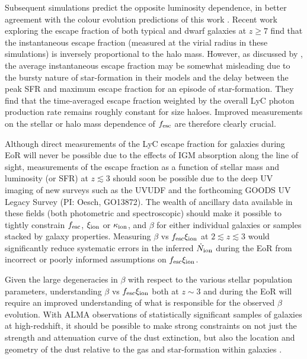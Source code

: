 Subsequent simulations predict the opposite luminosity dependence, in better agreement with the colour evolution predictions of this work \citep{Razoumov:2010bh,Yajima:2010fb}. Recent work exploring the escape fraction of both typical \citep{Kimm:2014gv} and dwarf \citep{Wise:2014kt} galaxies at $z\geq7$ find that the instantaneous escape fraction (measured at the virial radius in these simulations) is inversely proportional to the halo mass. However, as discussed by \citet{Kimm:2014gv}, the average instantaneous escape fraction may be somewhat misleading due to the bursty nature of star-formation in their models and the delay between the peak SFR and maximum escape fraction for an episode of star-formation. They find that the time-averaged escape fraction weighted by the overall LyC photon production rate remains roughly constant for size haloes. Improved measurements on the stellar or halo mass dependence of $f_{\rm{esc}}$ are therefore clearly crucial.

Although direct measurements of the LyC escape fraction for galaxies during EoR will never be possible due to the effects of IGM absorption along the line of sight, measurements of the escape fraction as a function of stellar mass and luminosity (or SFR) at $z \lesssim 3$ should soon be possible due to the deep UV imaging of new surveys such as the UVUDF \citep{Teplitz:2013jg} and the forthcoming GOODS UV Legacy Survey (PI: Oesch, GO13872). The wealth of ancillary data available in these fields (both photometric and spectroscopic) should make it possible to tightly constrain $f_{\rm{esc}}$, $\xi_{\rm{ion}}$ or $\kappa_{\rm{ion}}$, and $\beta$ for either individual galaxies or samples stacked by galaxy properties. Measuring $\beta$ vs $f_{\rm{esc}}\xi_{\rm{ion}}$ at $2 \lesssim z \lesssim 3$ would significantly reduce systematic errors in the inferred $\dot{N}_{\rm{ion}}$ during the EoR from incorrect or poorly informed assumptions on $f_{\rm{esc}}\xi_{\rm{ion}}$.

Given the large degeneracies in $\beta$ with respect to the various stellar population parameters, understanding  $\beta$ vs $f_{\rm{esc}}\xi_{\rm{ion}}$ both at $z\sim3$ and during the EoR will require an improved understanding of what is responsible for the observed $\beta$ evolution. With ALMA observations of statistically significant samples of galaxies at high-redshift, it should be possible to make strong constraints on not just the strength and attenuation curve of the dust extinction, but also the location and geometry of the dust relative to the gas and star-formation within galaxies \citep{DeBreuck:2014eo}.

